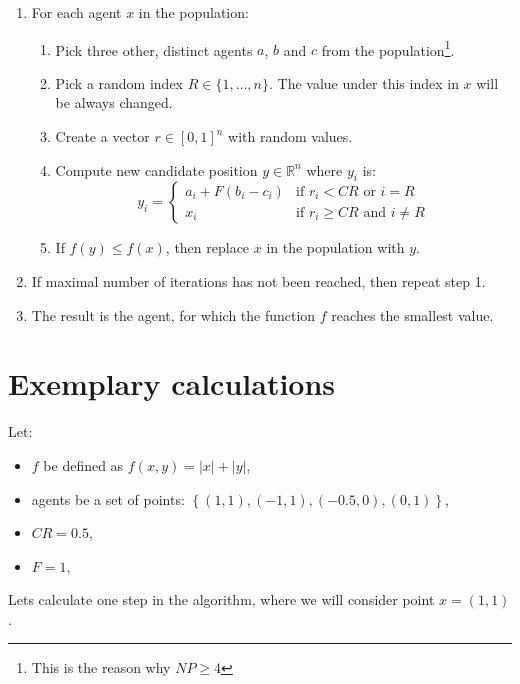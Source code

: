\documentclass[a4paper,12pt]{article}
\begin{document}
\begin{enumerate}
  \item For each agent $x$ in the population:
    \begin{enumerate}
      \item Pick three other, distinct agents $a$, $b$ and $c$ from the
        population\footnote{This is the reason why $NP \geq 4$}.
      \item Pick a random index $R \in \{1, \dots, n\}$. The value under this
        index in $x$ will be always changed.
      \item Create a vector $r \in [0, 1]^n$ with random values.
      \item Compute new candidate position $y \in \mathbb{R}^n$ where $y_i$ is:
\[
  y_i = \begin{cases}
    a_i + F\left(b_i - c_i\right) & \text{if } r_i < CR \text{ or } i = R \\
    x_i & \text{if } r_i \geq CR \text{ and } i \not = R
  \end{cases}
\]
      \item If $f(y) \leq f(x)$, then replace $x$ in the population with $y$.
    \end{enumerate}
  \item If maximal number of iterations has not been reached, then repeat step
    1.
  \item The result is the agent, for which the function $f$ reaches the smallest 
    value.
\end{enumerate}

\section*{Exemplary calculations}

Let:

\begin{itemize}
  \item $f$ be defined as $f(x, y) = |x| + |y|$,
  \item agents be a set of points: $\left\{ (1, 1), (-1, 1), (-0.5, 0), (0, 1)
    \right\}$,
  \item $CR = 0.5$,
  \item $F = 1$,
\end{itemize}

Lets calculate one step in the algorithm, where we will consider point $x = (1, 1)$.
\end{document}
